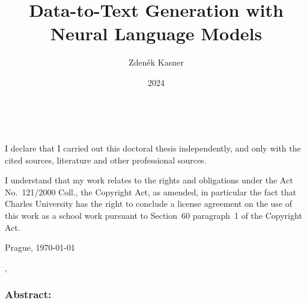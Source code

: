 \documentclass[12pt,notitlepage,a4paper,openright]{report}
\title{Data-to-Text Generation with Neural Language Models}
\author{Zdeněk Kasner}
\date{2024}
\begin{document}
%
%
\renewcommand{\thepage}{\roman{page}}
\renewcommand\cite{\citep}
\maketitle

\pagestyle{plain}
\normalsize
\setcounter{page}{2}

\cleardoublepage{}
\ \vspace{10mm}

\noindent \it

\vspace{\fill}
\noindent \rm
I declare that I carried out this doctoral thesis independently,
and only with the cited sources, literature and other professional sources.

I understand that my work relates to the rights and obligations
under the Act No.~121/2000 Coll., the Copyright Act, as amended,
in particular the fact that Charles University has the right
to conclude a license agreement on the use of this work as a school work
pursuant to Section~60 paragraph~1 of the Copyright Act.

\vspace{2cm}
\noindent Prague, \today \hspace{\fill}\theauthor %



\cleardoublepage{} %
\pagestyle{plain}


\begin{description}[leftmargin=7.5em,labelwidth=7em,labelindent=0em,labelsep=0.5em]
    \item[Title:] \thetitle{}
    \item[Author:] \theauthor{}
    \item[Department:] \thedept{}
    \item[Supervisor:] \thesupervisor{},\\ \thedept{}
\end{description}
\subsubsection{Abstract:}
\end{document}
